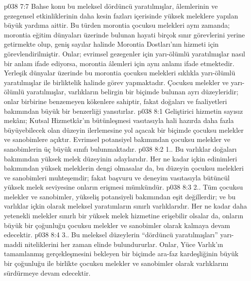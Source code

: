 \vs p038 7:7 Bahse konu bu meleksel dördüncü yaratılmışlar, âlemlerinin ve gezegensel etkinliklerinin daha kesin fazları içerisinde yüksek meleklere yapılan büyük yardıma aittir. Bu türden morontia çocuksu melekleri aynı zamanda; morontia eğitim dünyaları üzerinde bulunan hayati birçok sınır görevlerini yerine getirmekte olup, geniş sayılar halinde Morontia Dostları’nın hizmeti için görevlendirilmiştir. Onlar; evrimsel gezegenler için yarı\hyp{}ölümlü yaratılmışlar nasıl bir anlam ifade ediyorsa, morontia âlemleri için aynı anlamı ifade etmektedir. Yerleşik dünyalar üzerinde bu morontia çocuksu melekleri sıklıkla yarı\hyp{}ölümlü yaratılmışlar ile birliktelik halinde görev yapmaktadır. Çocuksu melekler ve yarı\hyp{}ölümlü yaratılmışlar, varlıkların belirgin bir biçimde bulunan ayrı düzeyleridir; onlar birbirine benzemeyen kökenlere sahiptir, fakat doğaları ve faaliyetleri bakımından büyük bir benzerliği yansıtırlar.
\vs p038 8:1 Geliştirici hizmetin sayısız mekânı; Kutsal Hizmetkâr’ın bütünleşmesi vasıtasıyla hali hazırda daha fazla büyüyebilecek olan düzeyin ilerlemesine yol açacak bir biçimde çocuksu melekler ve sanobimlere açıktır. Evrimsel potansiyel bakımından çocuksu melekler ve sanobimlerin üç büyük sınıfı bulunmaktadır.
\vs p038 8:2 1.\bibnobreakspace {}. Bu varlıklar doğaları bakımından yüksek melek düzeyinin adaylarıdır. Her ne kadar içkin edinimleri bakımından yüksek meleklerin dengi olmasalar da, bu düzeyin çocuksu melekleri ve sanobimleri muhteşemdir; fakat başvuru ve deneyim vasıtasıyla bütüncül yüksek melek seviyesine onların erişmesi mümkündür.
\vs p038 8:3 2.\bibnobreakspace {}. Tüm çocuksu melekler ve sanobimler, yükseliş potansiyeli bakımından eşit değillerdir; ve bu varlıklar içkin olarak meleksel yaratımların sınırlı varlıklarıdır. Her ne kadar daha yetenekli melekler sınırlı bir yüksek melek hizmetine erişebilir olsalar da, onların büyük bir çoğunluğu çocuksu melekler ve sanobimler olarak kalmaya devam edecektir.
\vs p038 8:4 3.\bibnobreakspace {}. Bu meleksel düzeylerin “dördüncü yaratılmışları” yarı\hyp{}maddi niteliklerini her zaman elinde bulundururlar. Onlar, Yüce Varlık’ın tamamlanmış gerçekleşmesini bekleyen bir biçimde ara\hyp{}faz kardeşliğinin büyük bir çoğunluğu ile birlikte çocuksu melekler ve sanobimler olarak varlıklarını sürdürmeye devam edecektir.
